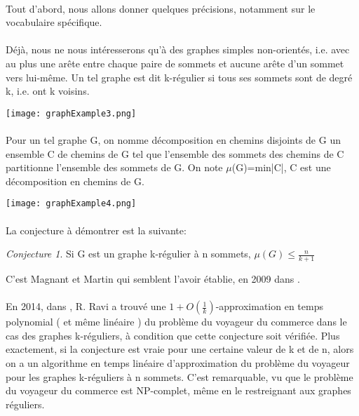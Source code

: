 \documentclass[a4paper]{article}
\theoremstyle{definition}
\theoremstyle{remark}
\newtheorem{conjecture}{Conjecture}[section]
\begin{document}
\paragraph{}
Tout d'abord, nous allons donner quelques précisions, notamment sur le vocabulaire spécifique.


\paragraph{}
Déjà, nous ne nous intéresserons qu'à des graphes simples non-orientés, i.e. avec au plus une arête entre chaque paire de sommets et aucune arête
d'un sommet vers lui-même. Un tel graphe est dit k-régulier si tous ses
sommets sont de degré k, i.e. ont k voisins.


\texttt{[image: graphExample3.png]}


\paragraph{}
Pour un tel graphe G, on nomme décomposition en chemins disjoints de G  un ensemble C de chemins de G tel que l'ensemble des sommets des chemins 
de C partitionne l'ensemble des sommets de G. On note
$\mu$(G)=min{|C|, C est une décomposition en chemins de G}.

\texttt{[image: graphExample4.png]}


\paragraph{}
La conjecture à démontrer est la suivante:
\begin{conjecture}
Si G est un graphe k-régulier à n sommets, $\mu(G) \leq \frac{n}{k+1}$
\end{conjecture}
C'est Magnant et Martin qui semblent l'avoir établie, en 2009 dans \cite{MagnantMartin}.


\paragraph{}
En 2014, dans \cite{FeigeRaviSingh}, R. Ravi a trouvé une $1 + O(\frac{1}{k})$-approximation en
temps polynomial ( et même linéaire ) du problème du voyageur du 
commerce dans le cas des graphes k-réguliers, à condition que cette 
conjecture soit vérifiée. Plus exactement, si la conjecture est vraie
pour une certaine valeur de k et de n, alors on a un algorithme en
temps linéaire d'approximation du problème du voyageur pour les graphes
k-réguliers à n sommets. C'est remarquable, vu que le problème du 
voyageur du commerce est NP-complet, même en le restreignant aux graphes
réguliers.
\end{document}
